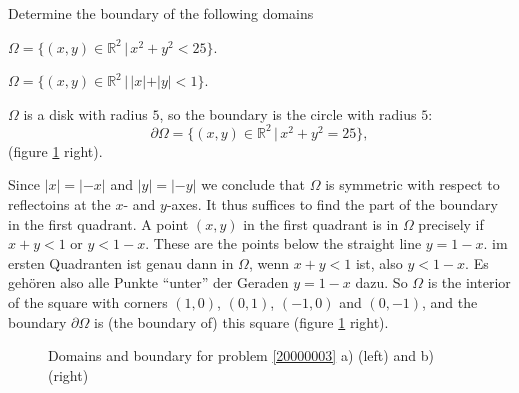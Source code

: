 Determine the boundary of the following domains
\begin{teilaufgaben}
\item
$\Omega=\{(x,y)\in\mathbb R^2\,|\, x^2+y^2<25\}$.
\item
$\Omega=\{(x,y)\in\mathbb R^2\,|\, |x|+|y|<1\}$.
\end{teilaufgaben}

\begin{loesung}
\begin{teilaufgaben}
\item
$\Omega$ is a disk with radius $5$, so the boundary is
the circle with radius $5$:
\[
\partial\Omega=\{(x,y)\in\mathbb R^2\,|\, x^2+y^2=25\},
\]
(figure \ref{20000003:fig} right).
\item
Since $|x|=|-x|$ and $|y|=|-y|$ we conclude that $\Omega$ is symmetric
with respect to reflectoins at the $x$- and $y$-axes.
It thus suffices to find the part of the boundary in the first quadrant.
A point $(x,y)$ in the first quadrant is in $\Omega$ precisely
if $x+y<1$ or $y<1-x$.
These are the points below the straight line $y=1-x$.
im ersten Quadranten ist genau dann in $\Omega$, wenn $x+y<1$ ist,
also $y<1-x$. Es gehören also alle Punkte ``unter'' der Geraden
$y=1-x$ dazu.
So $\Omega$ is the interior of the square with corners
$(1,0)$, $(0,1)$, $(-1,0)$ and $(0,-1)$,
and the boundary $\partial\Omega$ is (the boundary of) this square
(figure \ref{20000003:fig} right).
\qedhere
\end{teilaufgaben}
\begin{figure}
\begin{center}
\qquad
{}
\end{center}
\caption{Domains and boundary for problem \ref{20000003} a) (left)
and b) (right)\label{20000003:fig}}
\end{figure}
\end{loesung}
